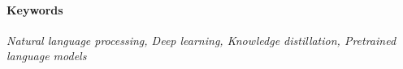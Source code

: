\paragraph{Keywords}
\textit{Natural language processing, Deep learning, Knowledge distillation, Pretrained language models}